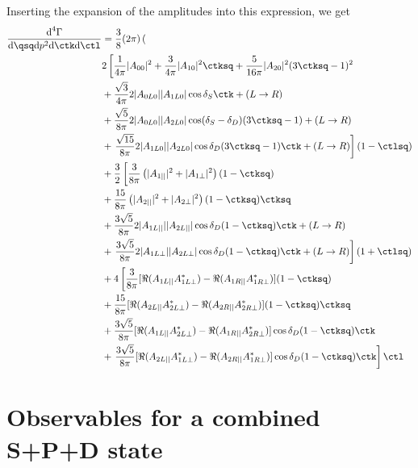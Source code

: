 Inserting the expansion of the amplitudes into this expression, we get
\begin{align}
 \frac{\text{d}^4\Gamma}{ \text{d}\qsq \text{d}p^2 \text{d}\ctk \text{d}\ctl} &= \frac{3}{8} (2\pi) \left( \right.  \nonumber \\
  &  2 \left[   \frac{1}{4\pi} |A_{00}|^2 + \frac{3}{4\pi} |A_{10}|^2 \ctksq +  \frac{5}{16\pi} |A_{20}|^2 (3\ctksq-1)^2 \right.  \nonumber \\
  & + \frac{\sqrt{3}}{4\pi} 2|A_{0L0}||A_{1L0}|\cos\delta_S \ctk + ( L \to R )  \nonumber \\
  & +  \frac{\sqrt{5}}{8\pi} 2|A_{0L0}||A_{2L0}|\cos(\delta_S-\delta_D) (3\ctksq-1) + ( L \to R )  \nonumber \\
  & + \left.  \frac{\sqrt{15}}{8\pi} 2|A_{1L0}||A_{2L0}|\cos\delta_D (3\ctksq-1) \ctk + ( L \to R )  \right] ( 1-\ctlsq) \nonumber \\
  & + \frac{3}{2} \left[ \frac{3}{8\pi}  \left(  |A_{1||}|^2  +  |A_{1\bot}|^2 \right) (1-\ctksq) \right.  \nonumber \\
  & + \frac{15}{8\pi} \left(  |A_{2||}|^2  + |A_{2\bot}|^2 \right) (1-\ctksq) \ctksq   \nonumber \\
  & + \frac{3\sqrt{5}}{8\pi} 2|A_{1L||}||A_{2L||}| \cos\delta_D (1-\ctksq)\ctk  + ( L \to R ) \nonumber \\
  & + \left. \frac{3\sqrt{5}}{8\pi} 2|A_{1L\bot}||A_{2L\bot}| \cos\delta_D (1-\ctksq)\ctk + ( L \to R ) \right] ( 1 + \ctlsq ) \nonumber \\  
  & + 4 \left[ \frac{3}{8\pi} [ \Re( A_{1L||}A_{1L\bot}^{*}) -\Re( A_{1R||} A_{1R\bot}^{*}) ] (1-\ctksq) \right.  \nonumber \\
  & + \frac{15}{8\pi} [ \Re( A_{2L||}A_{2L\bot}^{*}) -\Re( A_{2R||} A_{2R\bot}^{*}) ] (1-\ctksq) \ctksq  \nonumber \\
  & + \frac{3\sqrt{5}}{8\pi} [ \Re( A_{1L||}A_{2L\bot}^{*}) -\Re( A_{1R||} A_{2R\bot}^{*}) ] \cos\delta_D (1-\ctksq) \ctk  \nonumber \\
  & + \left. \frac{3\sqrt{5}}{8\pi} [ \Re( A_{2L||}A_{1L\bot}^{*}) -\Re( A_{2R||} A_{1R\bot}^{*}) ] \cos\delta_D (1-\ctksq) \ctk \right] \ctl \nonumber \\
\end{align}



\section{Observables for a combined S+P+D state}

